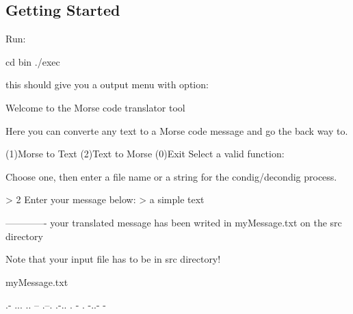 \subsection*{Getting Started}

Run\+: \begin{DoxyVerb}cd bin
./exec
\end{DoxyVerb}


this should give you a output menu with option\+: \begin{DoxyVerb}Welcome to the Morse code translator tool

Here you can converte any text to a Morse code message
and go the back way to.

(1)Morse to Text
(2)Text to Morse
(0)Exit
Select a valid function:
\end{DoxyVerb}


Choose one, then enter a file name or a string for the condig/decondig process. \begin{DoxyVerb}> 2
Enter your message below:
> a simple text

-------------
your translated message has been writed in myMessage.txt on the src directory
\end{DoxyVerb}


Note that your input file has to be in src directory!

my\+Message.\+txt \begin{DoxyVerb}.- ... .. -- .--. .-.. . - .  -..- - \end{DoxyVerb}
 